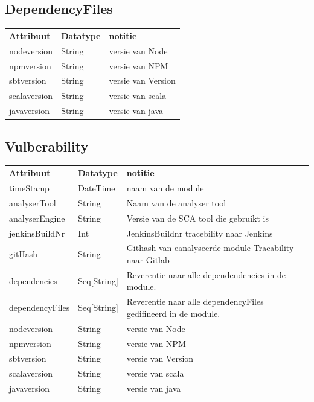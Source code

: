 \subsection{DependencyFiles}\label{subsec:dependencyFiles}
\begin{tabular}{lll}
    \textbf{Attribuut} & \textbf{Datatype} & \textbf{notitie}\\
    nodeversion & String & versie van Node  \\
    npmversion & String & versie van NPM  \\
    sbtversion & String & versie van Version  \\
    scalaversion & String & versie van scala  \\
    javaversion & String & versie van java \\
\end{tabular}

\subsection{Vulberability}\label{subsec:vulberability}


\begin{tabular}{lll}
    \textbf{Attribuut} & \textbf{Datatype} & \textbf{notitie}\\
    timeStamp & DateTime & naam van de module\\
    analyserTool & String & Naam van de analyser tool\\
    analyserEngine & String & Versie van de SCA tool die gebruikt is\\
    jenkinsBuildNr & Int & JenkinsBuildnr tracebility naar Jenkins\\
    gitHash & String & Githash van  eanalyseerde module Tracability naar Gitlab\\
    dependencies & Seq[String] & Reverentie naar alle dependendencies in de module.\\
    dependencyFiles & Seq[String] & Reverentie naar alle dependencyFiles gedifineerd in de module.\\
    nodeversion & String & versie van Node  \\
    npmversion & String & versie van NPM  \\
    sbtversion & String & versie van Version  \\
    scalaversion & String & versie van scala  \\
    javaversion & String & versie van java \\
\end{tabular}

